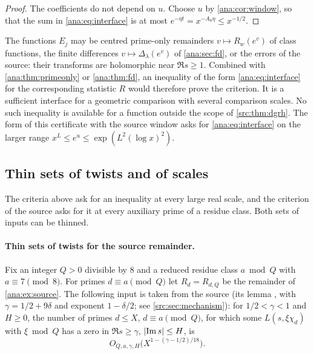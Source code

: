 \begin{proof}
The coefficients do not depend on $u$. Choose $u$ by \cref{ana:cor:window}, so that the sum in
\eqref{ana:eq:interface} is at most $e^{-\eta t}=x^{-A_0\eta}\le x^{-1/2}$.
\end{proof}

The functions $E_j$ may be centred prime-only remainders $v\mapsto R_w(e^v)$ of class
functions, the finite differences $v\mapsto\Delta_\lambda(e^v)$ of \cref{ana:sec:fd}, or the
errors of the source: their transforms are holomorphic near $\Re s\ge1$. Combined with
\cref{ana:thm:primeonly} or \cref{ana:thm:fd}, an inequality of the form
\eqref{ana:eq:interface} for the corresponding statistic $R$ would therefore prove the
criterion. It is a sufficient interface for a geometric comparison with several comparison
scales. No such inequality is available for a function outside the scope of
\cref{src:thm:dgrh}. The form of this certificate with the source window asks for
\eqref{ana:eq:interface} on the larger range $x^{L}\le e^u\le\exp(L^2(\log x)^2)$.

\subsection{Thin sets of twists and of scales}\label{ana:sec:sparse}
{\raggedright{}}

The criteria above ask for an inequality at every large real scale, and the criterion of the
source asks for it at every auxiliary prime of a residue class. Both sets of inputs can be
thinned.

\paragraph{Thin sets of twists for the source remainder.}
Fix an integer $Q>0$ divisible by $8$ and a reduced residue class $a\bmod Q$ with
$a\equiv7\pmod8$. For primes $d\equiv a\pmod Q$ let $R_d=R_{d,Q}$ be the remainder of
\cref{ana:ex:source}. The following input is taken from the source (its lemma
, with $\gamma=1/2+9\delta$ and exponent $1-\delta/2$; see
\cref{src:sec:mechanism}): for $1/2<\gamma<1$ and $H\ge0$, the number of primes $d\le X$,
$d\equiv a\pmod Q$, for which some $L(s,\xi\chi_d)$ with $\xi\bmod Q$ has a zero in
$\Re s\ge\gamma$, $\lvert\operatorname{Im} s\rvert\le H$, is
\begin{equation}\label{ana:eq:zerodensity}
 O_{Q,a,\gamma,H}\bigl(X^{1-(\gamma-1/2)/18}\bigr).
\end{equation}

